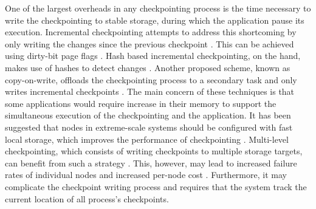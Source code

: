 One of the largest overheads in any checkpointing process is the time necessary to write the checkpointing 
to stable storage, during which the application pause its execution. Incremental checkpointing attempts
to address this shortcoming by only writing the changes since the previous checkpoint \cite{nam_ftc_1997,Agarwal:04:Adaptive}. This
can be achieved using dirty-bit page flags \cite{plank_ftcs_1994,elnozahy_1992_manetho}. Hash based incremental checkpointing, on the
hand, makes use of hashes to detect changes \cite{nam_ftc_1997,Agarwal:04:Adaptive}. Another proposed scheme, known as copy-on-write,
offloads the checkpointing process to a secondary task and only writes incremental checkpoints \cite{li_trans_1994}.
The main concern of these techniques is that some applications would require increase in their
memory to support the simultaneous execution of the checkpointing and the application. It has been suggested that nodes in extreme-scale systems should be configured with fast local storage, which
improves the performance of checkpointing \cite{doe_ascr_exascale_2011}. Multi-level checkpointing, which consists of
writing checkpoints to multiple storage targets, can benefit from such a strategy \cite{Moody:10:SCR,hakkarine_2013}. This,
however, may lead to increased failure rates of individual nodes and increased per-node cost \cite{chen_2011_hystor}.
Furthermore, it may complicate the checkpoint writing process and requires that the system track the
current location of all process's checkpoints.


